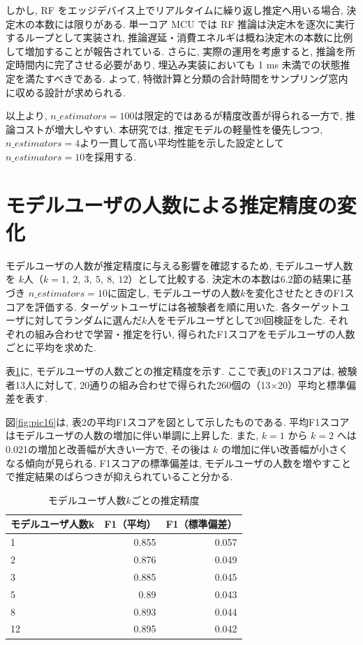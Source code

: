 \documentclass[a4paper,12pt]{jreport}
\begin{document}
しかし,  RF をエッジデバイス上でリアルタイムに繰り返し推定へ用いる場合, 決定木の本数には限りがある. 単一コア MCU では RF 推論は決定木を逐次に実行するループとして実装され, 推論遅延・消費エネルギは概ね決定木の本数に比例して増加することが報告されている. さらに, 実際の運用を考慮すると, 推論を所定時間内に完了させる必要があり, 埋込み実装においても 1 ms 未満での状態推定を満たすべきである. よって, 特徴計算と分類の合計時間をサンプリング窓内に収める設計が求められる.  

以上より, $n\_estimators=100$は限定的ではあるが精度改善が得られる一方で, 推論コストが増大しやすい. 本研究では, 推定モデルの軽量性を優先しつつ,  $n\_estimators=4$より一貫して高い平均性能を示した設定として $n\_estimators=10$を採用する.  


\section{モデルユーザの人数による推定精度の変化}
モデルユーザの人数が推定精度に与える影響を確認するため,  モデルユーザ人数を $k$人（$k=1,\ 2,\ 3,\ 5,\ 8,\ 12$）として比較する. 決定木の本数は6.2節の結果に基づき $n\_estimators=10$に固定し,  モデルユーザの人数$k$を変化させたときのF1スコアを評価する. ターゲットユーザには各被験者を順に用いた. 各ターゲットユーザに対してランダムに選んだ$k$人をモデルユーザとして20回検証をした. それぞれの組み合わせで学習・推定を行い, 得られたF1スコアをモデルユーザの人数ごとに平均を求めた. 

表\ref{tab:num_k_F1}に, モデルユーザの人数ごとの推定精度を示す. ここで表\ref{tab:num_k_F1}のF1スコアは, 被験者13人に対して, 20通りの組み合わせで得られた260個の（13×20）平均と標準偏差を表す. 

図\ref{fig:pic16}は, 表2の平均F1スコアを図として示したものである. 平均F1スコアはモデルユーザの人数の増加に伴い単調に上昇した. また, $k=1$ から $k=2$ へは0.021の増加と改善幅が大きい一方で, その後は $k$ の増加に伴い改善幅が小さくなる傾向が見られる. F1スコアの標準偏差は, モデルユーザの人数を増やすことで推定結果のばらつきが抑えられていること分かる.  


\begin{table}[tb]
  \centering
  \caption{モデルユーザ人数$k$ごとの推定精度}
  \label{tab:num_k_F1}
  \renewcommand{\arraystretch}{1.2}
  \small
  \begin{tabular}{|l|r|r|}
    \hline
    モデルユーザ人数k & F1（平均） & F1（標準偏差） \\ \hline
1 & 0.855 & 0.057 \\ \hline
2 & 0.876 & 0.049 \\ \hline
3 & 0.885 & 0.045 \\ \hline
5 & 0.89 & 0.043 \\ \hline
8 & 0.893 & 0.044 \\ \hline
12 & 0.895 & 0.042 \\ \hline
  \end{tabular}
\end{table}
\end{document}
